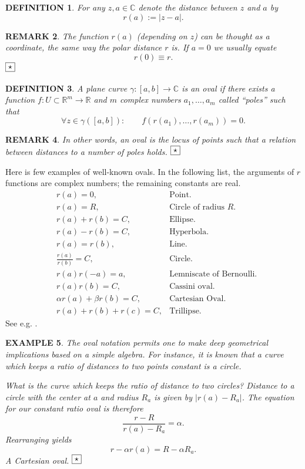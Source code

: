 \documentclass[10pt,a4paper,reqno]{amsart}
\newtheorem{defi}{\bf D\scriptsize EFINITION \normalsize}
\newtheorem{rem}[defi]{\bf R\scriptsize EMARK \normalsize}
\newtheorem{exa}[defi]{\bf E\scriptsize XAMPLE \normalsize}
\def\kopr{\hfill\raisebox{3pt}{\framebox{$\star$}}}
\newenvironment{example}{\begin{exa}\rm}{$\kopr$\end{exa}}
\newenvironment{remark}{\begin{rem}\rm}{$\kopr$\end{rem}}
\newenvironment{definition}{\begin{defi}\rm}{\end{defi}}
\begin{document}
\begin{definition}For any $z,a\in\mathbb{C}$ denote the distance between $z$ and $a$ by
$$
r(a):=|z-a|.
$$
\end{definition}
\begin{remark}
The \textit{function} $r(a)$ (depending on $z$) can be thought as a \textit{coordinate}, the same way the polar distance $r$ is. If $a=0$ we usually equate
$$
r(0)\equiv r.
$$
\end{remark}
\begin{definition}
A plane curve $\gamma:[a,b]\to \mathbb{C}$ is an \textit{oval} if there exists a function $f:U\subset\mathbb{R}^m\to \mathbb{R}$ and $m$ complex numbers $a_1,\dots, a_m$ called ``poles'' such that
\begin{equation}
\forall z\in \gamma([a,b]):\qquad f(r(a_1),\dots, r(a_m))=0.
\end{equation}
\end{definition}
\begin{remark}
In other words, an \textit{oval} is the locus of points such that a relation between distances to a number of poles holds.
\end{remark}
Here is few examples of well-known ovals. In the following list, the arguments of $r$ functions  are complex numbers; the remaining constants are real.
\begin{align}
&r(a)=0, & \text{Point.}\\
&r(a)=R, & \text{Circle of radius $R$.}\\
&r(a)+r(b)=C, & \text{Ellipse.}\\
&r(a)-r(b)=C, & \text{Hyperbola.}\\
&r(a)=r(b), & \text{Line.}\\
&\frac{r(a)}{r(b)}=C, & \text{Circle.}\\
&r(a)r(-a)=a, & \text{Lemniscate of Bernoulli.}\\
&r(a)r(b)=C, & \text{Cassini oval.}\\
&\alpha r(a)+\beta r(b)=C, & \text{Cartesian Oval.}\\
&r(a)+r(b)+r(c)=C, & \text{Trillipse.}
\end{align}
See e.g. \cite{Lawrence, Zwikker}.
\begin{example}
The oval notation permits one to make deep geometrical implications based on a simple algebra. For instance, it is known that a curve which keeps a ratio of distances to two points constant is a circle.

What is the curve which keeps the ratio of distance to two \textit{circles}? Distance to a circle with the center at $a$ and radius $R_a$ is given by $|r(a)-R_a|$. The 
equation for our constant ratio oval is therefore
$$
\frac{r-R}{r(a)-R_a}=\alpha.
$$
Rearranging yields
$$
r-\alpha r(a)=R-\alpha R_a.
$$ 
A Cartesian oval.
\end{example}
\end{document}
